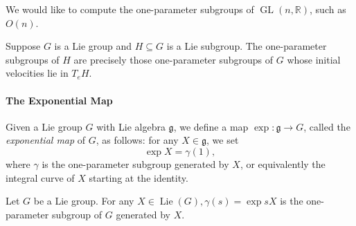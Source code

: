 We would like to compute the one-parameter subgroups of \( \operatorname{GL}(n, \mathbb{R}) \), such as \( O(n) \).

\begin{proposition}
  \label{proposition-one-parameter-subgroup-of-subgroups-of-GL}
  Suppose \( G \) is a Lie group and \( H \subseteq G \) is a Lie subgroup.
  The one-parameter subgroups of \( H \) are precisely those one-parameter subgroups of \( G \) whose initial velocities lie in \( T_e H \).
\end{proposition}

\paragraph{The Exponential Map}

\begin{definition}
  \label{definition-exponential-map}
  Given a Lie group \( G \) with Lie algebra \( \mathfrak{g} \), we define a map \( \exp: \mathfrak{g} \to G \), called the \emph{exponential map} of \( G \), as follows: for any \( X \in \mathfrak{g} \), we set
  \[
    \exp X = \gamma(1),
  \]
  where \( \gamma \) is the one-parameter subgroup generated by \( X \), or equivalently the integral curve of \( X \) starting at the identity.
\end{definition}

\begin{proposition}
  \label{proposition-one-parameter-subgroup-under-exp}
  Let \( G \) be a Lie group.
  For any \( X \in \operatorname{Lie}(G), \gamma(s) = \exp s X \) is the one-parameter subgroup of \( G \) generated by \( X \).
\end{proposition}


